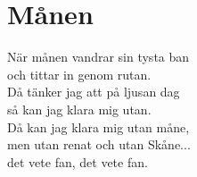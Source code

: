 \section{Månen}
När månen vandrar sin tysta ban\\
och tittar in genom rutan.\\
Då tänker jag att på ljusan dag\\
så kan jag klara mig utan.\\
Då kan jag klara mig utan måne,\\
men utan renat och utan Skåne...\\
det vete fan, det vete fan.\\